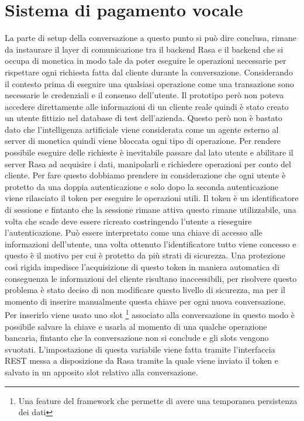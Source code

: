 \section{Sistema di pagamento vocale}

La parte di setup della conversazione a questo punto si può dire conclusa, rimane da instaurare il layer di comunicazione tra il backend Rasa e il backend che si occupa di monetica in modo tale da poter eseguire le operazioni necessarie per rispettare ogni richiesta fatta dal cliente durante la conversazione. Considerando il contesto prima di eseguire una qualsiasi operazione come una transazione sono necessarie le credenziali e il consenso dell'utente. Il prototipo però non poteva accedere direttamente alle informazioni di un cliente reale quindi è stato creato un utente fittizio nel database di test dell'azienda.
Questo però non è bastato dato che l'intelligenza artificiale viene considerata come un agente esterno al server di monetica quindi viene bloccata ogni tipo di operazione. Per rendere possibile eseguire delle richieste è inevitabile passare dal lato utente e abilitare il server Rasa ad acquisire i dati, manipolarli e richiedere operazioni per conto del cliente.
Per fare questo dobbiamo prendere in considerazione che ogni utente è protetto da una doppia autenticazione e solo dopo la seconda autenticazione viene rilasciato il token per eseguire le operazioni utili. Il token è un identificatore di sessione e fintanto che la sessione rimane attiva questo rimane utilizzabile, una volta che scade deve essere ricreato costringendo l'utente a rieseguire l'autenticazione. Può essere interpretato come una chiave di accesso alle informazioni dell'utente, una volta ottenuto l'identificatore tutto viene concesso e questo è il motivo per cui è protetto da più strati di sicurezza.
Una protezione così rigida impedisce l'acquisizione di questo token in maniera automatica di conseguenza le informazioni del cliente risultano inaccessibili, per risolvere questo problema è stato deciso di non modificare questo livello di sicurezza, ma per il momento di inserire manualmente questa chiave per ogni nuova conversazione.
Per inserirlo viene usato uno slot \footnote{Una feature del framework che permette di avere una temporanea persistenza dei dati} associato alla conversazione in questo modo è possibile salvare la chiave e usarla al momento di una qualche operazione bancaria, fintanto che la conversazione non si conclude e gli slots vengono svuotati.
L'impostazione di questa variabile viene fatta tramite l'interfaccia REST messa a disposizione da Rasa tramite la quale viene inviato il token e salvato in un apposito slot relativo alla conversazione. 
